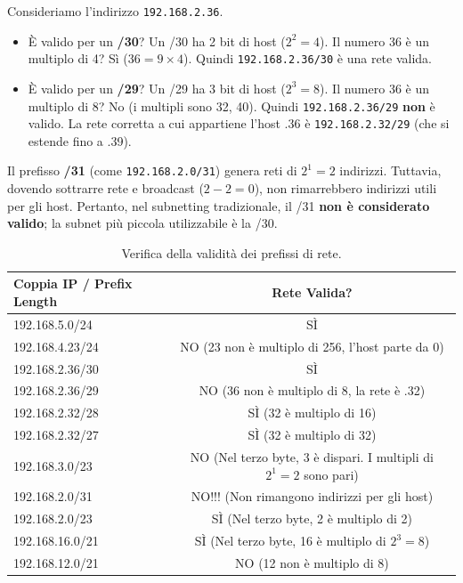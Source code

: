 \begin{example}[Analisi di 192.168.2.36/29 e /30]
Consideriamo l'indirizzo \texttt{192.168.2.36}.
\begin{itemize}
    \item È valido per un \textbf{/30}? Un /30 ha 2 bit di host ($2^2=4$). Il numero 36 è un multiplo di 4? Sì ($36 = 9 \times 4$). Quindi \texttt{192.168.2.36/30} è una rete valida.
    \item È valido per un \textbf{/29}? Un /29 ha 3 bit di host ($2^3=8$). Il numero 36 è un multiplo di 8? No (i multipli sono 32, 40). Quindi \texttt{192.168.2.36/29} \textbf{non} è valido. La rete corretta a cui appartiene l'host .36 è \texttt{192.168.2.32/29} (che si estende fino a .39).
\end{itemize}
\end{example}

\begin{remark}
Il prefisso \textbf{/31} (come \texttt{192.168.2.0/31}) genera reti di $2^1 = 2$ indirizzi. Tuttavia, dovendo sottrarre rete e broadcast ($2-2=0$), non rimarrebbero indirizzi utili per gli host. Pertanto, nel subnetting tradizionale, il /31 \textbf{non è considerato valido}; la subnet più piccola utilizzabile è la /30.
\end{remark}

\begin{table}[H]
    \centering
    \begin{tabular}{|l|c|}
        \hline
        \textbf{Coppia IP / Prefix Length} & \textbf{Rete Valida?} \\
        \hline
        192.168.5.0/24 & SÌ \\
        \hline
        192.168.4.23/24 & NO (23 non è multiplo di 256, l'host parte da 0) \\
        \hline
        192.168.2.36/30 & SÌ \\
        \hline
        192.168.2.36/29 & NO (36 non è multiplo di 8, la rete è .32) \\
        \hline
        192.168.2.32/28 & SÌ (32 è multiplo di 16) \\
        \hline
        192.168.2.32/27 & SÌ (32 è multiplo di 32) \\
        \hline
        192.168.3.0/23 & NO (Nel terzo byte, 3 è dispari. I multipli di $2^1=2$ sono pari) \\
        \hline
        192.168.2.0/31 & NO!!! (Non rimangono indirizzi per gli host) \\
        \hline
        192.168.2.0/23 & SÌ (Nel terzo byte, 2 è multiplo di 2) \\
        \hline
        192.168.16.0/21 & SÌ (Nel terzo byte, 16 è multiplo di $2^3=8$) \\
        \hline
        192.168.12.0/21 & NO (12 non è multiplo di 8) \\
        \hline
    \end{tabular}
    \caption{Verifica della validità dei prefissi di rete.}
    \label{tab:valid_prefixes}
\end{table}


